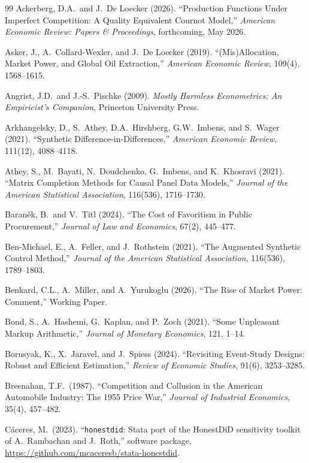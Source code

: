 \documentclass[11pt]{article}
\begin{document}
\begin{thebibliography}{99}
 Ackerberg, D.A.\ and J.~De Loecker (2026). ``Production Functions Under Imperfect Competition: A Quality Equivalent Cournot Model,'' \emph{American Economic Review: Papers \& Proceedings}, forthcoming, May 2026.

 Asker, J., A.~Collard-Wexler, and J.~De Loecker (2019). ``(Mis)Allocation, Market Power, and Global Oil Extraction,'' \emph{American Economic Review}, 109(4), 1568--1615.

 Angrist, J.D.\ and J.-S.~Pischke (2009). \emph{Mostly Harmless Econometrics: An Empiricist's Companion}, Princeton University Press.

 Arkhangelsky, D., S.~Athey, D.A.~Hirshberg, G.W.~Imbens, and S.~Wager (2021). ``Synthetic Difference-in-Differences,'' \emph{American Economic Review}, 111(12), 4088--4118.

 Athey, S., M.~Bayati, N.~Doudchenko, G.~Imbens, and K.~Khosravi (2021). ``Matrix Completion Methods for Causal Panel Data Models,'' \emph{Journal of the American Statistical Association}, 116(536), 1716--1730.

 Baran\v{e}k, B.\ and V.~Titl (2024). ``The Cost of Favoritism in Public Procurement,'' \emph{Journal of Law and Economics}, 67(2), 445--477.

 Ben-Michael, E., A.~Feller, and J.~Rothstein (2021). ``The Augmented Synthetic Control Method,'' \emph{Journal of the American Statistical Association}, 116(536), 1789--1803.

 Benkard, C.L., A.~Miller, and A.~Yurukoglu (2026). ``The Rise of Market Power: Comment,'' Working Paper.

 Bond, S., A.~Hashemi, G.~Kaplan, and P.~Zoch (2021). ``Some Unpleasant Markup Arithmetic,'' \emph{Journal of Monetary Economics}, 121, 1--14.

 Borusyak, K., X.~Jaravel, and J.~Spiess (2024). ``Revisiting Event-Study Designs: Robust and Efficient Estimation,'' \emph{Review of Economic Studies}, 91(6), 3253--3285.

 Bresnahan, T.F.\ (1987). ``Competition and Collusion in the American Automobile Industry: The 1955 Price War,'' \emph{Journal of Industrial Economics}, 35(4), 457--482.

 C\'{a}ceres, M.\ (2023). ``\texttt{honestdid}: Stata port of the HonestDiD sensitivity toolkit of A.\ Rambachan and J.\ Roth,'' software package, \url{https://github.com/mcaceresb/stata-honestdid}.


\end{thebibliography}
\end{document}
